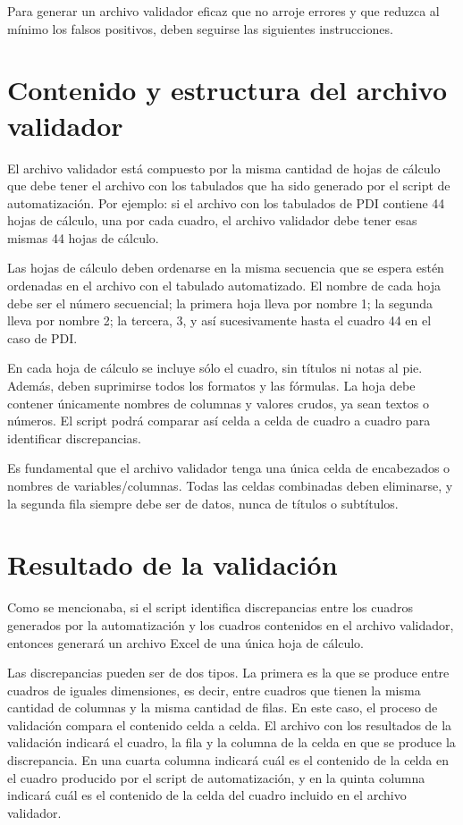 \documentclass[
  spanish,
]{book}
\begin{document}
Para generar un archivo validador eficaz que no arroje errores y que reduzca al mínimo los falsos positivos, deben seguirse las siguientes instrucciones.

\hypertarget{contenido-y-estructura-del-archivo-validador}{%
\section{Contenido y estructura del archivo validador}\label{contenido-y-estructura-del-archivo-validador}}

El archivo validador está compuesto por la misma cantidad de hojas de cálculo que debe tener el archivo con los tabulados que ha sido generado por el script de automatización. Por ejemplo: si el archivo con los tabulados de PDI contiene 44 hojas de cálculo, una por cada cuadro, el archivo validador debe tener esas mismas 44 hojas de cálculo.

Las hojas de cálculo deben ordenarse en la misma secuencia que se espera estén ordenadas en el archivo con el tabulado automatizado. El nombre de cada hoja debe ser el número secuencial; la primera hoja lleva por nombre 1; la segunda lleva por nombre 2; la tercera, 3, y así sucesivamente hasta el cuadro 44 en el caso de PDI.

En cada hoja de cálculo se incluye sólo el cuadro, sin títulos ni notas al pie. Además, deben suprimirse todos los formatos y las fórmulas. La hoja debe contener únicamente nombres de columnas y valores crudos, ya sean textos o números. El script podrá comparar así celda a celda de cuadro a cuadro para identificar discrepancias.

Es fundamental que el archivo validador tenga una única celda de encabezados o nombres de variables/columnas. Todas las celdas combinadas deben eliminarse, y la segunda fila siempre debe ser de datos, nunca de títulos o subtítulos.

\hypertarget{resultado-de-la-validaciuxf3n}{%
\section{Resultado de la validación}\label{resultado-de-la-validaciuxf3n}}

Como se mencionaba, si el script identifica discrepancias entre los cuadros generados por la automatización y los cuadros contenidos en el archivo validador, entonces generará un archivo Excel de una única hoja de cálculo.

Las discrepancias pueden ser de dos tipos. La primera es la que se produce entre cuadros de iguales dimensiones, es decir, entre cuadros que tienen la misma cantidad de columnas y la misma cantidad de filas. En este caso, el proceso de validación compara el contenido celda a celda. El archivo con los resultados de la validación indicará el cuadro, la fila y la columna de la celda en que se produce la discrepancia. En una cuarta columna indicará cuál es el contenido de la celda en el cuadro producido por el script de automatización, y en la quinta columna indicará cuál es el contenido de la celda del cuadro incluido en el archivo validador.
\end{document}
